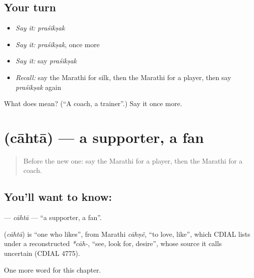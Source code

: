 \subsection*{Your turn}
\begin{itemize}
\raggedright
  \item \emph{Say it:} \emph{praśikṣak}
  \item \emph{Say it:} \emph{praśikṣak}, once more
  \item \emph{Say it:} say \emph{praśikṣak}
  \item \emph{Recall:} say the Marathi for silk, then the Marathi for a player, then say \emph{praśikṣak} again
\end{itemize}

\begin{tcolorbox}[breakable,colback=teal!4,colframe=teal!35!black,title={Before you move on}]
What does  mean? (\textquotedblleft{}A coach, a trainer\textquotedblright{}.) Say it once more.
\end{tcolorbox}
\section[\texorpdfstring{\mr{चाहता} (cāhtā)}{चाहता (cāhtā)}]{ (cāhtā) — a supporter, a fan}

\label{lesson:MR-C215-cahta}



\begin{quote}
Before the new one: say the Marathi for a player, then the Marathi for a coach.
\end{quote}

\subsection*{You'll want to know: }
\textbf{} — \emph{cāhtā} — \textquotedblleft{}a supporter, a fan\textquotedblright{}.

\begin{cousinweb}
\textbf{} (\emph{cāhtā}) is \textquotedblleft{}one who likes\textquotedblright{}, from Marathi \emph{cāhṇẽ}, \textquotedblleft{}to love, like\textquotedblright{}, which CDIAL lists under a reconstructed \emph{*cāh-}, \textquotedblleft{}see, look for, desire\textquotedblright{}, whose source it calls uncertain (CDIAL 4775).
\end{cousinweb}

\begin{grammarlens}[title={What you've built}]
One more word for this chapter.
\end{grammarlens}

